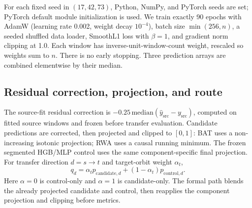 \documentclass[journal]{IEEEtran}
\begin{document}
For each fixed seed in $(17,42,73)$, Python, NumPy, and PyTorch seeds are set; PyTorch default module initialization is used. We train exactly 90 epochs with AdamW (learning rate 0.002, weight decay $10^{-4}$), batch size $\min(256,n)$, a seeded shuffled data loader, SmoothL1 loss with $\beta=1$, and gradient norm clipping at 1.0. Each window has inverse-unit-window-count weight, rescaled so weights sum to $n$. There is no early stopping. Three prediction arrays are combined elementwise by their median.

\subsection{Residual correction, projection, and route}
The source-fit residual correction is $-0.25\,\mathrm{median}(\hat y_{\mathrm{src}}-y_{\mathrm{src}})$, computed on fitted source windows and frozen before transfer evaluation. Candidate predictions are corrected, then projected and clipped to $[0,1]$: BAT uses a non-increasing isotonic projection; RWA uses a causal running minimum. The frozen segmented HGB/MLP control uses the same component-specific final projection. For transfer direction $d=s\to t$ and target-orbit weight $\alpha_t$,
\begin{equation}
 q_d=\alpha_t p_{\mathrm{candidate},d}+(1-\alpha_t)p_{\mathrm{control},d}.
\end{equation}
Here $\alpha=0$ is control-only and $\alpha=1$ is candidate-only. The formal path blends the already projected candidate and control, then reapplies the component projection and clipping before metrics.
\end{document}
